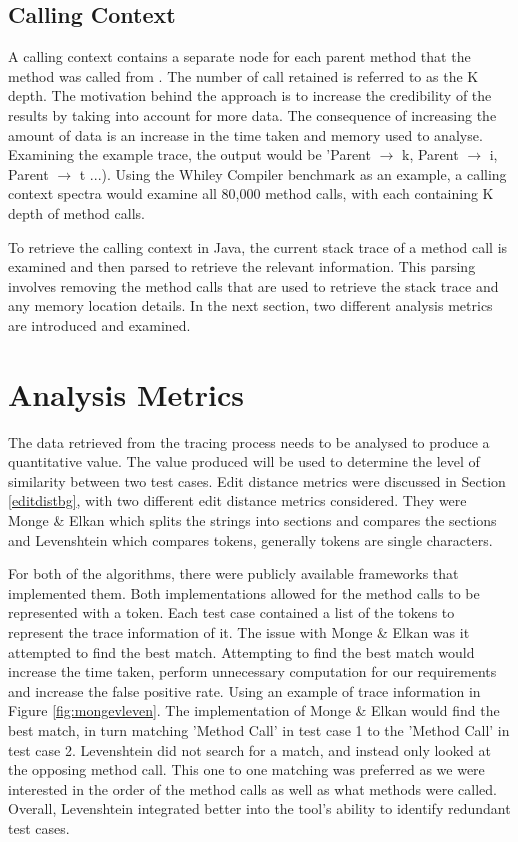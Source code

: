 \subsection{Calling Context}
A calling context contains a separate node for each parent method that the method was called from \cite{Zhuang06accurate}. The number of call retained is referred to as the K depth. The motivation behind the approach is to increase the credibility of the results by taking into account for more data. The consequence of increasing the amount of data is an increase in the time taken and memory used to analyse. Examining the example trace, the output would be 'Parent $\rightarrow$ k, Parent $\rightarrow$ i, Parent $\rightarrow$ t ...). Using the Whiley Compiler benchmark as an example, a calling context spectra would examine all 80,000 method calls, with each containing K depth of method calls. 

To retrieve the calling context in Java, the current stack trace of a method call is examined and then parsed to retrieve the relevant information. This parsing involves removing the method calls that are used to retrieve the stack trace and any memory location details.  In the next section, two different analysis metrics are introduced and examined.

\section{Analysis Metrics}
\label{S:metrics}
The data retrieved from the tracing process needs to be analysed to produce a quantitative value. The value produced will be used to determine the level of similarity between two test cases. Edit distance metrics were discussed in Section \ref{editdistbg}, with two different edit distance metrics considered. They were Monge \& Elkan \cite{monge1997efficient} which splits the strings into sections and compares the sections and Levenshtein \cite{levenshtein1966binary} which compares tokens, generally tokens are single characters. 

For both of the algorithms, there were publicly available frameworks that implemented them. Both implementations allowed for the method calls to be represented with a token. Each test case contained a list of the tokens to represent the trace information of it. The issue with Monge \& Elkan was it attempted to find the best match. Attempting to find the best match would increase the time taken, perform unnecessary computation for our requirements and increase the false positive rate. Using an example of trace information in Figure \ref{fig:mongevleven}. The implementation of Monge \& Elkan would find the best match, in turn matching 'Method Call' in test case 1 to the 'Method Call' in test case 2. Levenshtein did not search for a match, and instead only looked at the opposing method call. This one to one matching was preferred as we were interested in the order of the method calls as well as what methods were called. Overall, Levenshtein integrated better into the tool's ability to identify redundant test cases.

